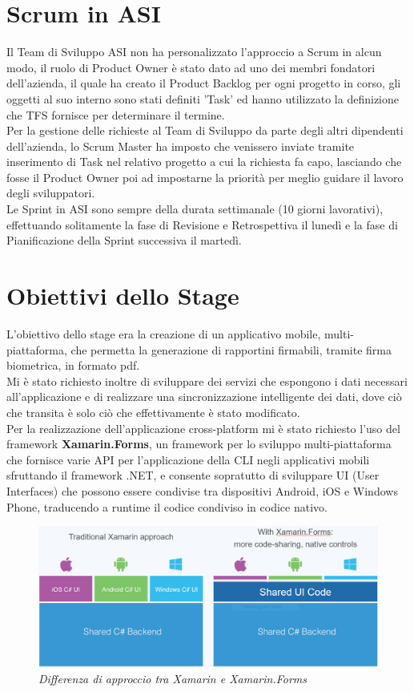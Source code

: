 \section{Scrum in ASI}
Il Team di Sviluppo ASI non ha personalizzato l'approccio a Scrum in alcun modo, il ruolo di Product Owner è stato dato ad uno dei membri fondatori dell'azienda, il quale ha creato il Product Backlog per ogni progetto in corso, gli oggetti al suo interno sono stati definiti 'Task' ed hanno utilizzato la definizione che TFS fornisce per determinare il termine.
\\
Per la gestione delle richieste al Team di Sviluppo da parte degli altri dipendenti dell'azienda, lo Scrum Master ha imposto che venissero inviate tramite inserimento di Task nel relativo progetto a cui la richiesta fa capo, lasciando che fosse il Product Owner poi ad impostarne la priorità per meglio guidare il lavoro degli sviluppatori.
\\
Le Sprint in ASI sono sempre della durata settimanale (10 giorni lavorativi), effettuando solitamente la fase di Revisione e Retrospettiva il lunedì e la fase di Pianificazione della Sprint successiva il martedì.

\section{Obiettivi dello Stage}
L'obiettivo dello stage era la creazione di un applicativo mobile, multi-piattaforma, che permetta la generazione di rapportini firmabili, tramite firma biometrica, in formato pdf.
\\
Mi è stato richiesto inoltre di sviluppare dei servizi che espongono i dati necessari all'applicazione e di realizzare una sincronizzazione intelligente dei dati, dove ciò che transita è solo ciò che effettivamente è stato modificato. 
\\
Per la realizzazione dell'applicazione cross-platform mi è stato richiesto l'uso del framework \textbf{Xamarin.Forms}, un framework per lo sviluppo multi-piattaforma che fornisce varie API per l'applicazione della CLI negli applicativi mobili sfruttando il framework .NET, e consente sopratutto di sviluppare UI (User Interfaces) che possono essere condivise tra dispositivi Android, iOS e Windows Phone, traducendo a runtime il codice condiviso in codice nativo.

\begin{figure}[ht]
	\centering
	\includegraphics[scale=0.57]{immagini/processo/xamarinForms.png}
	\caption{\textit{Differenza di approccio tra Xamarin e Xamarin.Forms}}
\end{figure}\FloatBarrier

